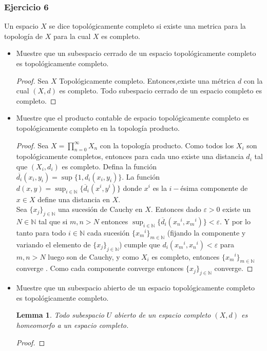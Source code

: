 \documentclass[letterpaper]{article}
\newtheorem{lemma}[theorem]{Lemma}
\begin{document}
\subsubsection*{Ejercicio  6}
Un espacio $X$ se dice topol\'ogicamente completo si  existe una metrica para la topolog\'ia de $X$ para la cual $X$ es  completo.
\begin{itemize}
\item Muestre que un subespacio cerrado de un espacio topol\'ogicamente  completo es  topol\'ogicamente completo.
\begin{proof}
Sea $X$ Topol\'ogicamente completo. Entonces,existe una m\'etrica $d$ con la cual $(X,d)$ es completo. Todo subespacio cerrado de un espacio completo es completo.
\end{proof}
\item Muestre que el producto contable de espacio topol\'ogicamente completo es  topol\'ogicamente completo en la topolog\'ia producto.
\begin{proof}
Sea $X=\prod _{ n=0 }^{ \infty  }{ { X }_{ n } } $ con la topolog\'ia producto. Como todos los $X_i$ son topol\'ogicamente completos, entonces para cada uno existe una distancia $d_i$ tal que $(X_i,d_i)$ es completo. Defina la funci\'on $\overline{d_i}(x_i,y_i)=\sup \{1,d_i(x_i,y_i)\}$. La funci\'on $d(x,y)=\sup _{i\in \mathbb{N}}\{ \overline{d}_i(x^i,y^i)\}$  donde  $x^i$ es la $i-$\'esima componente de $x\in X$ define una distancia en $X$.\\
Sea $\{x_j\}_{j\in \mathbb{N}} $ una sucesi\'on de Cauchy   en $X$. Entonces dado  $\varepsilon >0$ existe un $N \in \mathbb{N}$ tal que si $m,n> N$ entonces $\sup _{i\in \mathbb{N}}\{ \overline{d}_i({x_n}^i,{x_m}^i)\}<\varepsilon$. Y por lo tanto para todo $i\in \mathbb{N}$ cada sucesi\'on $\{{x_m}^i\}_{m\in \mathbb{N}}$  (fijando la componente y variando el elemento de $\{x_j\}_{j\in \mathbb{N}} $) cumple que $d_i({x_m}^i,{x_n}^i)<\varepsilon$ para  $m,n> N$ luego son de Cauchy, y como $X_i$ es completo, entonces $\{{x_m}^i\}_{m\in \mathbb{N}}$ converge . Como cada componente converge entonces  $\{x_j\}_{j\in \mathbb{N}} $ converge.
\end{proof}
\item Muestre que un subespacio abierto de un espacio topol\'ogicamente completo es topol\'ogicamente  completo.
\begin{lemma}
Todo subespacio $U$ abierto de un espacio completo  $(X,d)$ es homeomorfo  a un espacio completo.
\end{lemma}
\begin{proof}

\end{proof}
\end{itemize}
\end{document}
